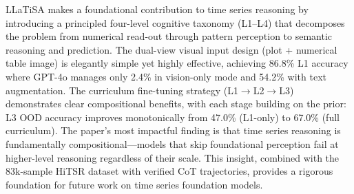 \documentclass[11pt]{article}
\begin{document}
LLaTiSA makes a foundational contribution to time series reasoning by introducing a principled four-level cognitive taxonomy (L1--L4) that decomposes the problem from numerical read-out through pattern perception to semantic reasoning and prediction. The dual-view visual input design (plot + numerical table image) is elegantly simple yet highly effective, achieving 86.8\% L1 accuracy where GPT-4o manages only 2.4\% in vision-only mode and 54.2\% with text augmentation. The curriculum fine-tuning strategy (L1$\to$L2$\to$L3) demonstrates clear compositional benefits, with each stage building on the prior: L3 OOD accuracy improves monotonically from 47.0\% (L1-only) to 67.0\% (full curriculum). The paper's most impactful finding is that time series reasoning is fundamentally compositional---models that skip foundational perception fail at higher-level reasoning regardless of their scale. This insight, combined with the 83k-sample HiTSR dataset with verified CoT trajectories, provides a rigorous foundation for future work on time series foundation models.
\end{document}
